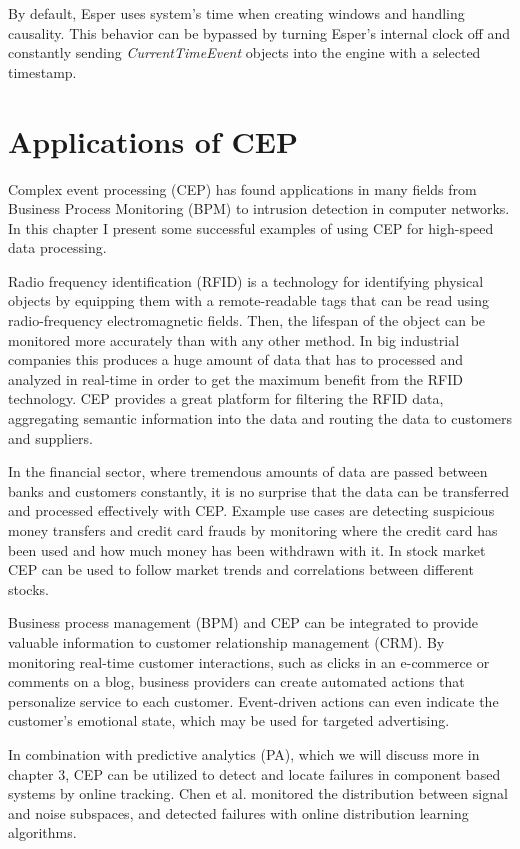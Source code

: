 By default, Esper uses system's time when creating windows and handling causality. This behavior can be bypassed by turning Esper's internal clock off and constantly sending \emph{CurrentTimeEvent} objects into the engine with a selected timestamp. \cite{EsperReference} 


\section{Applications of CEP}
Complex event processing (CEP) has found applications in many fields from Business Process Monitoring (BPM) to intrusion detection in computer networks. In this chapter I present some successful examples of using CEP for high-speed data processing.

Radio frequency identification (RFID) is a technology for identifying physical objects by equipping them with a remote-readable tags that can be read using radio-frequency electromagnetic fields. Then, the lifespan of the object can be monitored more accurately than with any other method. In big industrial companies this produces a huge amount of data that has to processed and analyzed in real-time in order to get the maximum benefit from the RFID technology. CEP provides a great platform for filtering the RFID data, aggregating semantic information into the data and routing the data to customers and suppliers. \cite{Wang06}  

In the financial sector, where tremendous amounts of data are passed between banks and customers constantly, it is no surprise that the data can be transferred and processed effectively with CEP. Example use cases are detecting suspicious money transfers and credit card frauds by monitoring where the credit card has been used and how much money has been withdrawn with it. In stock market CEP can be used to follow market trends and correlations between different stocks. \cite{Adi06}

Business process management (BPM) and CEP can be integrated to provide valuable information to customer relationship management (CRM). By monitoring real-time customer interactions, such as clicks in an e-commerce or comments on a blog, business providers can create automated actions that personalize service to each customer. Event-driven actions can even indicate the customer's emotional state, which may be used for targeted advertising. \cite{Kobielus08}

In combination with predictive analytics (PA), which we will discuss more in chapter 3, CEP can be utilized to detect and locate failures in component based systems by online tracking. Chen et al. \cite{Chen06} monitored the distribution between signal and noise subspaces, and detected failures with online distribution learning algorithms. 

